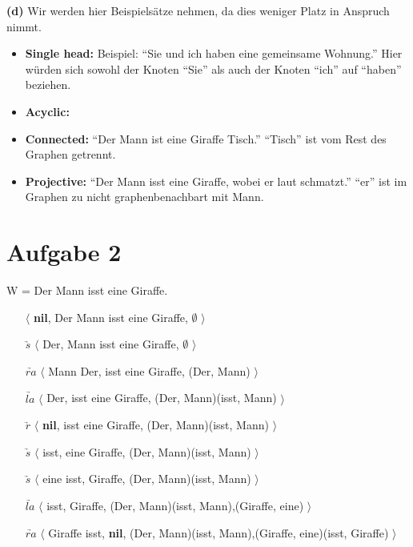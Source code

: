 \documentclass[a4paper,10pt]{article}
\begin{document}
\newpage
\noindent \textbf{(d)} Wir werden hier Beispielsätze nehmen, da dies weniger Platz in Anspruch nimmt.
\begin{itemize}
 \item \textbf{Single head:} Beispiel: ``Sie und ich haben eine gemeinsame Wohnung.'' Hier würden sich sowohl der Knoten ``Sie'' als auch der Knoten ``ich'' auf ``haben''
 beziehen.
 \item \textbf{Acyclic:}
 \item \textbf{Connected:} ``Der Mann ist eine Giraffe Tisch.'' ``Tisch'' ist vom Rest des Graphen getrennt.
 \item \textbf{Projective:} ``Der Mann isst eine Giraffe, wobei er laut schmatzt.'' ``er'' ist im Graphen zu nicht graphenbenachbart mit Mann. 
\end{itemize}

\section*{Aufgabe 2}
W =  Der Mann isst eine Giraffe. 
\begin{itemize}
 \item[]  $\langle$ \textbf{nil}, Der Mann isst eine Giraffe, $\emptyset$ $\rangle$
 \item[$\underrightarrow{s}$] $\langle$ Der, Mann isst eine Giraffe, $\emptyset$ $\rangle$
 \item[$\underrightarrow{ra}$] $\langle$ Mann Der, isst eine Giraffe, {(Der, Mann)} $\rangle$
 \item[$\underrightarrow{la}$] $\langle$ Der, isst eine Giraffe, {(Der, Mann)(isst, Mann)} $\rangle$
 \item[$\underrightarrow{r}$] $\langle$ \textbf{nil}, isst eine Giraffe, {(Der, Mann)(isst, Mann)} $\rangle$
 \item[$\underrightarrow{s}$] $\langle$ isst, eine Giraffe, {(Der, Mann)(isst, Mann)} $\rangle$
 \item[$\underrightarrow{s}$] $\langle$ eine isst, Giraffe, {(Der, Mann)(isst, Mann)} $\rangle$
 \item[$\underrightarrow{la}$] $\langle$ isst, Giraffe, {(Der, Mann)(isst, Mann),(Giraffe, eine)} $\rangle$
 \item[$\underrightarrow{ra}$] $\langle$ Giraffe isst, \textbf{nil}, {(Der, Mann)(isst, Mann),(Giraffe, eine)(isst, Giraffe)} $\rangle$
\end{itemize}
\end{document}
